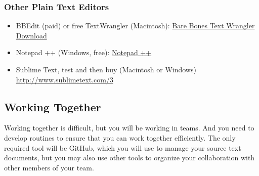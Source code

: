 \documentclass[]{article}
\begin{document}
\subsubsection{Other Plain Text Editors}\label{other-plain-text-editors}

\begin{itemize}
\itemsep1pt\parskip0pt
\item
  BBEdit (paid) or free TextWrangler (Macintosh):
  \href{http://www.barebones.com/products/textwrangler/}{Bare Bones Text
  Wrangler Download}
\item
  Notepad ++ (Windows, free):
  \href{http://notepad-plus-plus.org/}{Notepad ++}
\item
  Sublime Text, test and then buy (Macintosh or Windows)
  \url{http://www.sublimetext.com/3}
\end{itemize}

\subsection{Working Together}\label{working-together}

Working together is difficult, but you will be working in teams. And you
need to develop routines to ensure that you can work together
efficiently. The only required tool will be GitHub, which you will use
to manage your source text documents, but you may also use other tools
to organize your collaboration with other members of your team.
\end{document}
